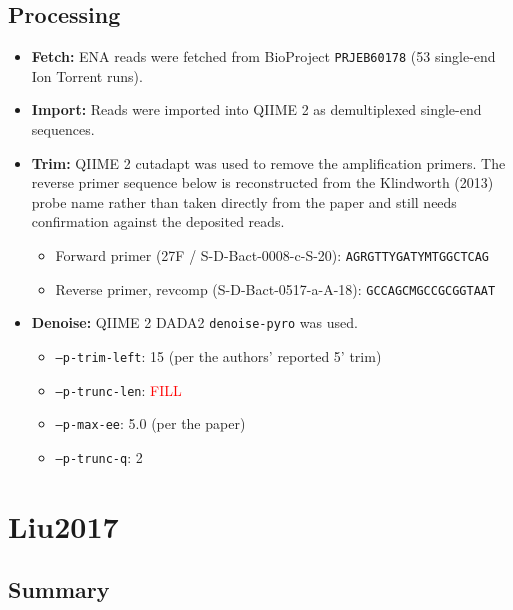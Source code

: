 \documentclass[11pt,a4paper]{article}
\begin{document}
\subsection{Processing}
\begin{itemize}
\item \textbf{Fetch:} ENA reads were fetched from BioProject \texttt{PRJEB60178} (53 single-end Ion Torrent runs).
\item \textbf{Import:} Reads were imported into QIIME 2 as demultiplexed single-end sequences.
\item \textbf{Trim:} QIIME 2 cutadapt was used to remove the amplification primers. The reverse primer sequence below is reconstructed from the Klindworth (2013) probe name rather than taken directly from the paper and still needs confirmation against the deposited reads.
  \begin{itemize}
  \item Forward primer (27F / S-D-Bact-0008-c-S-20): \texttt{AGRGTTYGATYMTGGCTCAG}
  \item Reverse primer, revcomp (S-D-Bact-0517-a-A-18): \texttt{GCCAGCMGCCGCGGTAAT}
  \end{itemize}
\item \textbf{Denoise:} QIIME 2 DADA2 \texttt{denoise-pyro} was used.
  \begin{itemize}
  \item \texttt{--p-trim-left}: 15 (per the authors' reported 5' trim)
  \item \texttt{--p-trunc-len}: \textcolor{red}{FILL}
  \item \texttt{--p-max-ee}: 5.0 (per the paper)
  \item \texttt{--p-trunc-q}: 2
  \end{itemize}
\end{itemize}


\section{Liu2017}
\subsection{Summary}
\end{document}
